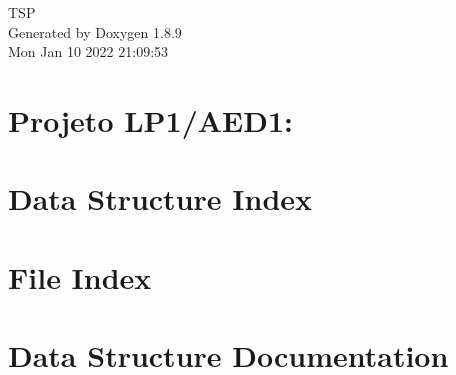\documentclass[twoside]{book}
\newcommand{\+}{\discretionary{\mbox{\scriptsize$\hookleftarrow$}}{}{}}
\newcommand{\clearemptydoublepage}{%
  \newpage{\pagestyle{empty}\cleardoublepage}%
}
\begin{document}
\hypersetup{pageanchor=false,
             bookmarks=true,
             bookmarksnumbered=true,
             pdfencoding=unicode
            }
\begin{titlepage}
\vspace*{7cm}
\begin{center}%
{\Large T\+S\+P }\\
\vspace*{1cm}
{\large Generated by Doxygen 1.8.9}\\
\vspace*{0.5cm}
{\small Mon Jan 10 2022 21:09:53}\\
\end{center}
\end{titlepage}
\clearemptydoublepage
\tableofcontents
\clearemptydoublepage
{}
\hypersetup{pageanchor=true}

\chapter{Projeto L\+P1/\+A\+E\+D1\+:}
\label{md_delivery}
\hypertarget{md_delivery}{}

\chapter{Data Structure Index}

\chapter{File Index}

\chapter{Data Structure Documentation}















\end{document}
